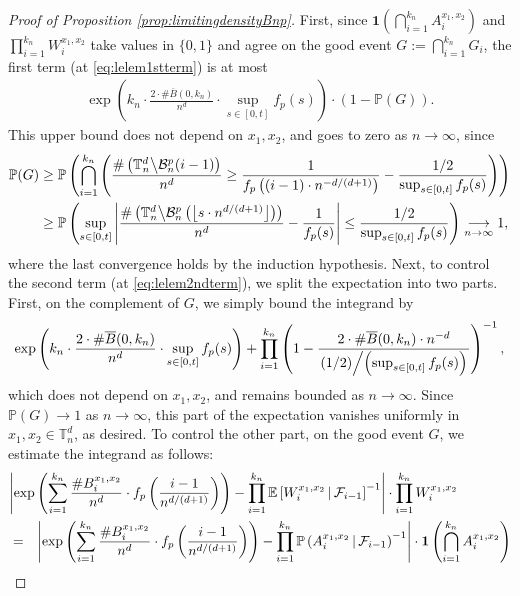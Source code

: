\documentclass[a4paper,11pt]{article}
\begin{document}
\begin{proof}[Proof of Proposition \ref{prop:limitingdensityBnp}]
First, since $\mathbf{1}\left(\bigcap_{i=1}^{k_n}A_i^{x_1,x_2}\right)$ and $\prod_{i=1}^{k_n}W_i^{x_1,x_2}$ take values in $\{0,1\}$ and agree on the good event $G:=\bigcap_{i=1}^{k_n}G_i$, the first term (at \eqref{eq:lelem1stterm}) is at most
\begin{eqnarray*}
\exp\left(k_n\cdot\frac{2\cdot\#\overline{B}(0,k_n)}{n^d}\cdot\sup_{s\in[0,t]}f_p(s)\right)\cdot\left(1-\mathbb{P}(G)\right).
\end{eqnarray*}
This upper bound does not depend on $x_1,x_2$, and goes to zero as $n\to\infty$, since
\[\begin{split}
\mathbb{P}(G)&\geq\mathbb{P}\left(\bigcap_{i=1}^{k_n}\left(\frac{\#\left(\mathbb{T}_n^d\middle\backslash\mathcal{B}_n^p(i-1)\right)}{n^d}\geq\frac{1}{f_p\left((i-1)\cdot n^{-d/(d+1)}\right)}-\frac{1/2}{\sup_{s\in[0,t]}f_p(s)}\right)\right)\\
&\geq\mathbb{P}\left(\sup_{s\in[0,t]}\left|\frac{\#\left(\mathbb{T}_n^d\middle\backslash\mathcal{B}_n^p\left(\left\lfloor s\cdot n^{d/(d+1)}\right\rfloor\right)\right)}{n^d}-\frac{1}{f_p(s)}\right|\leq\frac{1/2}{\sup_{s\in[0,t]}f_p(s)}\right)\underset{n\to\infty}{\longrightarrow}1,
\end{split}\]
where the last convergence holds by the induction hypothesis.
Next, to control the second term (at \eqref{eq:lelem2ndterm}), we split the expectation into two parts.
First, on the complement of $G$, we simply bound the integrand by
\[\exp\left(k_n\cdot\frac{2\cdot\#\overline{B}(0,k_n)}{n^d}\cdot\sup_{s\in[0,t]}f_p(s)\right)+\prod_{i=1}^{k_n}\left(1-\frac{2\cdot\#\overline{B}(0,k_n)\cdot n^{-d}}{\left.(1/2)\middle/\left(\sup_{s\in[0,t]}f_p(s)\right)\right.}\right)^{-1},\]
which does not depend on $x_1,x_2$, and remains bounded as $n\to\infty$.
Since $\mathbb{P}(G)\rightarrow1$ as $n\to\infty$, this part of the expectation vanishes uniformly in $x_1,x_2\in\mathbb{T}_n^d$, as desired.
To control the other part, on the good event $G$, we estimate the integrand as follows:
\begin{eqnarray*}
\lefteqn{\left|\exp\left(\sum_{i=1}^{k_n}\frac{\#B_i^{x_1,x_2}}{n^d}\cdot f_p\left(\frac{i-1}{n^{d/(d+1)}}\right)\right)-\prod_{i=1}^{k_n}\mathbb{E}\left[W_i^{x_1,x_2}\,\middle|\,\mathcal{F}_{i-1}\right]^{-1}\right|\cdot\prod_{i=1}^{k_n}W_i^{x_1,x_2}}\\
&=&\left|\exp\left(\sum_{i=1}^{k_n}\frac{\#B_i^{x_1,x_2}}{n^d}\cdot f_p\left(\frac{i-1}{n^{d/(d+1)}}\right)\right)-\prod_{i=1}^{k_n}\mathbb{P}\left(A_i^{x_1,x_2}\,\middle|\,\mathcal{F}_{i-1}\right)^{-1}\right|\cdot\mathbf{1}\left(\bigcap_{i=1}^{k_n}A_i^{x_1,x_2}\right)\\

\end{eqnarray*}
\end{proof}
\end{document}
